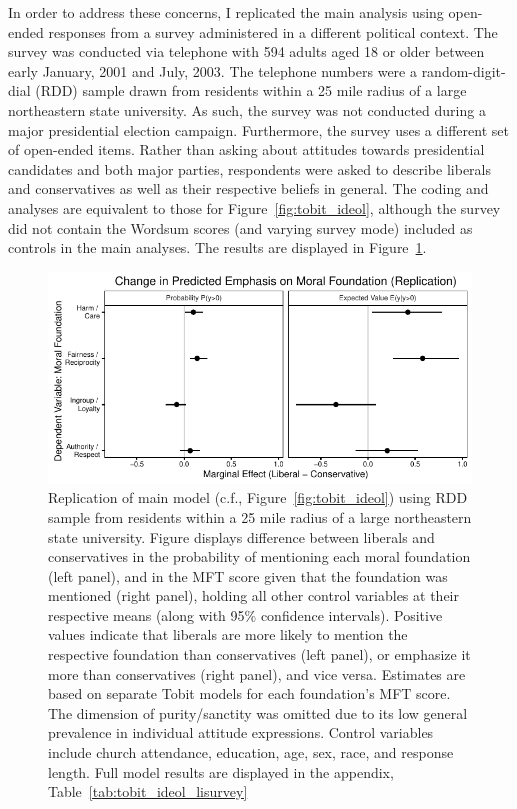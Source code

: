 \documentclass[12pt]{article}
\begin{document}
In order to address these concerns, I replicated the main analysis using open-ended responses from a survey administered in a different political context. The survey was conducted via telephone with 594 adults aged 18 or older between early January, 2001 and July, 2003. The telephone numbers were a random-digit-dial (RDD) sample drawn from residents within a 25 mile radius of a large northeastern state university. As such, the survey was not conducted during a  major presidential election campaign. Furthermore, the survey uses a different set of open-ended items. Rather than asking about attitudes towards presidential candidates and both major parties, respondents were asked to describe liberals and conservatives as well as their respective beliefs in general. The coding and analyses are equivalent to those for Figure~\ref{fig:tobit_ideol}, although the survey did not contain the Wordsum scores (and varying survey mode) included as controls in the main analyses. The results are displayed in Figure~\ref{fig:tobit_ideol_lisurvey}.

\begin{figure}[ht]\centering
\includegraphics{../calc/fig/tobit_ideol_lisurvey.pdf}
\caption{Replication of main model (c.f., Figure~\ref{fig:tobit_ideol}) using RDD sample from residents within a 25 mile radius of a large northeastern  state university. Figure displays difference between liberals and conservatives in the probability of mentioning each moral foundation (left panel), and in the MFT score given that the foundation was mentioned (right panel), holding all other control variables at their respective means (along with 95\% confidence intervals). Positive values indicate that liberals are more likely to mention the respective foundation than conservatives (left panel), or emphasize it more than conservatives (right panel), and vice versa. Estimates are based on separate Tobit models for each foundation's MFT score. The dimension of purity/sanctity was omitted due to its low general prevalence in individual attitude expressions. Control variables include church attendance, education, age, sex, race, and response length. Full model results are displayed in the appendix, Table~\ref{tab:tobit_ideol_lisurvey}
}\label{fig:tobit_ideol_lisurvey}
\end{figure}
\end{document}
